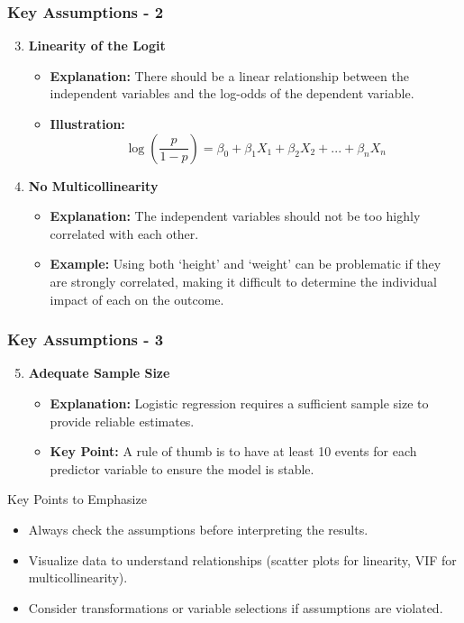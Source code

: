 \documentclass[aspectratio=169]{beamer}
\begin{document}
\begin{frame}[fragile]
    \frametitle{Key Assumptions - 2}
    \begin{enumerate}
        \setcounter{enumi}{2}
        \item \textbf{Linearity of the Logit}
        \begin{itemize}
            \item \textbf{Explanation:} There should be a linear relationship between the independent variables and the log-odds of the dependent variable.
            \item \textbf{Illustration:} 
            \begin{equation}
            \log\left(\frac{p}{1-p}\right) = \beta_0 + \beta_1 X_1 + \beta_2 X_2 + ... + \beta_n X_n
            \end{equation}
        \end{itemize}

        \item \textbf{No Multicollinearity}
        \begin{itemize}
            \item \textbf{Explanation:} The independent variables should not be too highly correlated with each other.
            \item \textbf{Example:} Using both ‘height’ and ‘weight’ can be problematic if they are strongly correlated, making it difficult to determine the individual impact of each on the outcome.
        \end{itemize}
    \end{enumerate}
\end{frame}

\begin{frame}[fragile]
    \frametitle{Key Assumptions - 3}
    \begin{enumerate}
        \setcounter{enumi}{4}
        \item \textbf{Adequate Sample Size}
        \begin{itemize}
            \item \textbf{Explanation:} Logistic regression requires a sufficient sample size to provide reliable estimates.
            \item \textbf{Key Point:} A rule of thumb is to have at least 10 events for each predictor variable to ensure the model is stable.
        \end{itemize}
    \end{enumerate}

    \begin{block}{Key Points to Emphasize}
        \begin{itemize}
            \item Always check the assumptions before interpreting the results.
            \item Visualize data to understand relationships (scatter plots for linearity, VIF for multicollinearity).
            \item Consider transformations or variable selections if assumptions are violated.
        \end{itemize}
    \end{block}
\end{frame}
\end{document}
